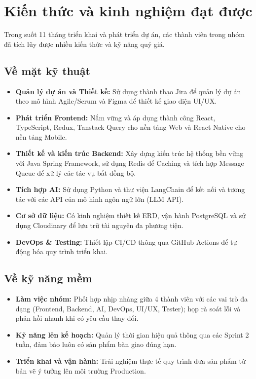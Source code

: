 \section{Kiến thức và kinh nghiệm đạt được}
Trong suốt 11 tháng triển khai và phát triển dự án, các thành viên trong nhóm đã tích lũy được nhiều kiến thức và kỹ năng quý giá.

\subsection{Về mặt kỹ thuật}
\begin{itemize}
    \item \textbf{Quản lý dự án và Thiết kế:} Sử dụng thành thạo Jira để quản lý dự án theo mô hình Agile/Scrum và Figma để thiết kế giao diện UI/UX.
    \item \textbf{Phát triển Frontend:} Nắm vững và áp dụng thành công React, TypeScript, Redux, Tanstack Query cho nền tảng Web và React Native cho nền tảng Mobile.
    \item \textbf{Thiết kế và kiến trúc Backend:} Xây dựng kiến trúc hệ thống bền vững với Java Spring Framework, sử dụng Redis để Caching và tích hợp Message Queue để xử lý các tác vụ bất đồng bộ.
    \item \textbf{Tích hợp AI:} Sử dụng Python và thư viện LangChain để kết nối và tương tác với các API của mô hình ngôn ngữ lớn (LLM API).
    \item \textbf{Cơ sở dữ liệu:} Có kinh nghiệm thiết kế ERD, vận hành PostgreSQL và sử dụng Cloudinary để lưu trữ tài nguyên đa phương tiện.
    \item \textbf{DevOps \& Testing:} Thiết lập CI/CD thông qua GitHub Actions để tự động hóa quy trình triển khai.
\end{itemize}

\subsection{Về kỹ năng mềm}
\begin{itemize}
    \item \textbf{Làm việc nhóm:} Phối hợp nhịp nhàng giữa 4 thành viên với các vai trò đa dạng (Frontend, Backend, AI, DevOps, UI/UX, Tester); họp rà soát lỗi và phản hồi nhanh khi có yêu cầu thay đổi.
    \item \textbf{Kỹ năng lên kế hoạch:} Quản lý thời gian hiệu quả thông qua các Sprint 2 tuần, đảm bảo luôn có sản phẩm bàn giao đúng hạn.
    \item \textbf{Triển khai và vận hành:} Trải nghiệm thực tế quy trình đưa sản phẩm từ bản vẽ ý tưởng lên môi trường Production.
\end{itemize}


